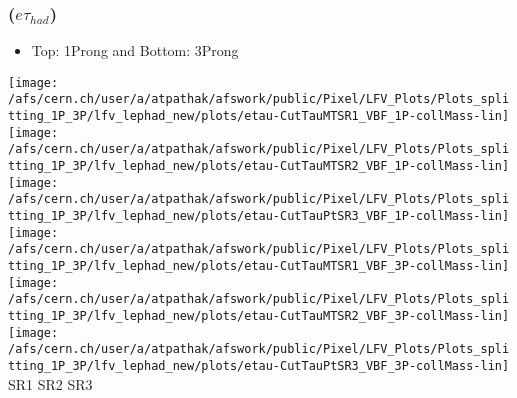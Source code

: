 \documentclass{beamer}
\begin{document}
\begin{frame}
\frametitle{($e\tau_{had}$)}
\begin{normalsize}
\begin{itemize}
\item Top: 1Prong and Bottom: 3Prong
\end{itemize}
\vspace*{0.5cm}
\texttt{[image: /afs/cern.ch/user/a/atpathak/afswork/public/Pixel/LFV\_Plots/Plots\_splitting\_1P\_3P/lfv\_lephad\_new/plots/etau-CutTauMTSR1\_VBF\_1P-collMass-lin]}
\texttt{[image: /afs/cern.ch/user/a/atpathak/afswork/public/Pixel/LFV\_Plots/Plots\_splitting\_1P\_3P/lfv\_lephad\_new/plots/etau-CutTauMTSR2\_VBF\_1P-collMass-lin]}
\texttt{[image: /afs/cern.ch/user/a/atpathak/afswork/public/Pixel/LFV\_Plots/Plots\_splitting\_1P\_3P/lfv\_lephad\_new/plots/etau-CutTauPtSR3\_VBF\_1P-collMass-lin]}\\
\vspace*{0.5cm}
\texttt{[image: /afs/cern.ch/user/a/atpathak/afswork/public/Pixel/LFV\_Plots/Plots\_splitting\_1P\_3P/lfv\_lephad\_new/plots/etau-CutTauMTSR1\_VBF\_3P-collMass-lin]}
\texttt{[image: /afs/cern.ch/user/a/atpathak/afswork/public/Pixel/LFV\_Plots/Plots\_splitting\_1P\_3P/lfv\_lephad\_new/plots/etau-CutTauMTSR2\_VBF\_3P-collMass-lin]}
\texttt{[image: /afs/cern.ch/user/a/atpathak/afswork/public/Pixel/LFV\_Plots/Plots\_splitting\_1P\_3P/lfv\_lephad\_new/plots/etau-CutTauPtSR3\_VBF\_3P-collMass-lin]}\\
\hspace{0.5in}SR1
\hspace{0.75in}SR2
\hspace{0.75in}SR3
\end{normalsize}
\end{frame}
\end{document}
